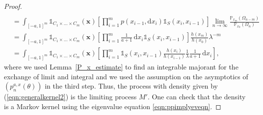 \documentclass[12pt]{article}
\renewcommand{\P}{\mathbb{P}} %
\newcommand{\1}{\mathds{1}}
\renewcommand{\d}{\mathrm{d}}
\theoremstyle{definition}
\theoremstyle{plain}
\theoremstyle{remark}
\begin{document}
\begin{proof}
\begin{align*}
    \\&=\int_{[-a,1]^m}\1_{C_1\times\dots\times C_m}(\mathbf{x})\left[\prod_{i=1}^m p(x_{i-1},\d x_i)\mathds{1}_S(x_i,x_{i-1})\right]\lim_{n\to\infty}\frac{\P_{x_m}(\Omega_{n-m})}{\P_{x_0}(\Omega_n)}
   \\&=\int_{[-a,1]^m}\1_{C_1\times\dots\times C_m}(\mathbf{x})\left[\prod_{i=1}^m \frac{1}{a+1}\,\d x_i\mathds{1}_S(x_i,x_{i-1})\right]\frac{h(x_m)}{h(x_0)}\lambda^{-m}
    \\&=\int_{[-a,1]^m}\1_{C_1\times\dots\times C_m}(\mathbf{x})\left[\prod_{i=1}^m \mathds{1}_S(x_i,x_{i-1})\frac{h(x_i)}{h(x_{i-1})}\frac{1}{\lambda}\frac{1}{a+1}\,\d x_i\right],
\end{align*}
where we used Lemma~\ref{P_x_estimate} to find an integrable majorant for the exchange of limit and integral and we used the assumption on the asymptotics of $(p_n^{a,x}(\theta))$ in the third step.
Thus, the process with density given by (\ref{eqn:generalkernel2}) is the limiting process $M'$.
One can check that the density is a Markov kernel using the eigenvalue equation \eqref{eqn:ppimplyeveqn}.
    \end{proof}
\end{document}
